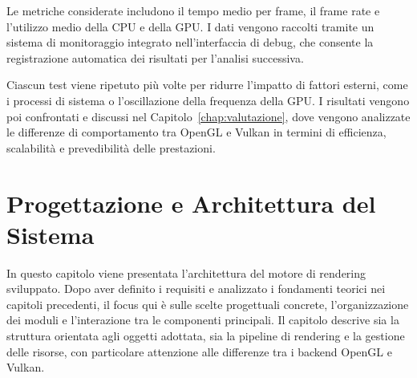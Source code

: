 \documentclass[12pt,a4paper,openright,twoside]{book}
\begin{document}
Le metriche considerate includono il tempo medio per frame, il frame rate e l'utilizzo medio della CPU e della GPU.
I dati vengono raccolti tramite un sistema di monitoraggio integrato nell'interfaccia di debug, che consente la
registrazione automatica dei risultati per l'analisi successiva.

Ciascun test viene ripetuto più volte per ridurre l'impatto di fattori esterni, come i processi di sistema o
l'oscillazione della frequenza della GPU. I risultati vengono poi confrontati e discussi nel
Capitolo~\ref{chap:valutazione}, dove vengono analizzate le differenze di comportamento tra OpenGL e Vulkan in termini
di efficienza, scalabilità e prevedibilità delle prestazioni.

\chapter{Progettazione e Architettura del Sistema}
\label{chap:design}
\noindent
In questo capitolo viene presentata l'architettura del motore di rendering sviluppato. Dopo aver definito i requisiti
e analizzato i fondamenti teorici nei capitoli precedenti, il focus qui è sulle scelte progettuali concrete,
l'organizzazione dei moduli e l'interazione tra le componenti principali. Il capitolo descrive sia la struttura
orientata agli oggetti adottata, sia la pipeline di rendering e la gestione delle risorse, con particolare attenzione
alle differenze tra i backend OpenGL e Vulkan.
\end{document}
